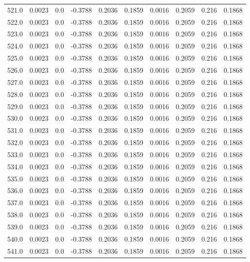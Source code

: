 \begin{longtable}{lrrrrrrrrr}
521.0 & 0.0023 & 0.0 & -0.3788 & 0.2036 & 0.1859 & 0.0016 & 0.2059 & 0.216 & 0.1868 \\
522.0 & 0.0023 & 0.0 & -0.3788 & 0.2036 & 0.1859 & 0.0016 & 0.2059 & 0.216 & 0.1868 \\
523.0 & 0.0023 & 0.0 & -0.3788 & 0.2036 & 0.1859 & 0.0016 & 0.2059 & 0.216 & 0.1868 \\
524.0 & 0.0023 & 0.0 & -0.3788 & 0.2036 & 0.1859 & 0.0016 & 0.2059 & 0.216 & 0.1868 \\
525.0 & 0.0023 & 0.0 & -0.3788 & 0.2036 & 0.1859 & 0.0016 & 0.2059 & 0.216 & 0.1868 \\
526.0 & 0.0023 & 0.0 & -0.3788 & 0.2036 & 0.1859 & 0.0016 & 0.2059 & 0.216 & 0.1868 \\
527.0 & 0.0023 & 0.0 & -0.3788 & 0.2036 & 0.1859 & 0.0016 & 0.2059 & 0.216 & 0.1868 \\
528.0 & 0.0023 & 0.0 & -0.3788 & 0.2036 & 0.1859 & 0.0016 & 0.2059 & 0.216 & 0.1868 \\
529.0 & 0.0023 & 0.0 & -0.3788 & 0.2036 & 0.1859 & 0.0016 & 0.2059 & 0.216 & 0.1868 \\
530.0 & 0.0023 & 0.0 & -0.3788 & 0.2036 & 0.1859 & 0.0016 & 0.2059 & 0.216 & 0.1868 \\
531.0 & 0.0023 & 0.0 & -0.3788 & 0.2036 & 0.1859 & 0.0016 & 0.2059 & 0.216 & 0.1868 \\
532.0 & 0.0023 & 0.0 & -0.3788 & 0.2036 & 0.1859 & 0.0016 & 0.2059 & 0.216 & 0.1868 \\
533.0 & 0.0023 & 0.0 & -0.3788 & 0.2036 & 0.1859 & 0.0016 & 0.2059 & 0.216 & 0.1868 \\
534.0 & 0.0023 & 0.0 & -0.3788 & 0.2036 & 0.1859 & 0.0016 & 0.2059 & 0.216 & 0.1868 \\
535.0 & 0.0023 & 0.0 & -0.3788 & 0.2036 & 0.1859 & 0.0016 & 0.2059 & 0.216 & 0.1868 \\
536.0 & 0.0023 & 0.0 & -0.3788 & 0.2036 & 0.1859 & 0.0016 & 0.2059 & 0.216 & 0.1868 \\
537.0 & 0.0023 & 0.0 & -0.3788 & 0.2036 & 0.1859 & 0.0016 & 0.2059 & 0.216 & 0.1868 \\
538.0 & 0.0023 & 0.0 & -0.3788 & 0.2036 & 0.1859 & 0.0016 & 0.2059 & 0.216 & 0.1868 \\
539.0 & 0.0023 & 0.0 & -0.3788 & 0.2036 & 0.1859 & 0.0016 & 0.2059 & 0.216 & 0.1868 \\
540.0 & 0.0023 & 0.0 & -0.3788 & 0.2036 & 0.1859 & 0.0016 & 0.2059 & 0.216 & 0.1868 \\
541.0 & 0.0023 & 0.0 & -0.3788 & 0.2036 & 0.1859 & 0.0016 & 0.2059 & 0.216 & 0.1868 \\

\end{longtable}
